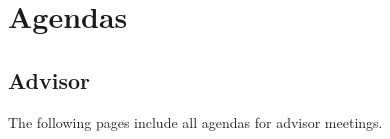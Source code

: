 \chapter{Agendas}

\section{Advisor}
The following pages include all agendas for advisor meetings.
\newpage
\begin{figure}[htb]

\end{figure}

\newpage

\begin{figure}[htb]

\end{figure}

\newpage

\begin{figure}[htb]

\end{figure}

\newpage

\begin{figure}[htb]

\end{figure}

\newpage

\begin{figure}[htb]

\end{figure}

\newpage

\begin{figure}[htb]

\end{figure}

\newpage

\begin{figure}[htb]

\end{figure}

\newpage

\begin{figure}[htb]

\end{figure}

\newpage

\begin{figure}[htb]

\end{figure}

